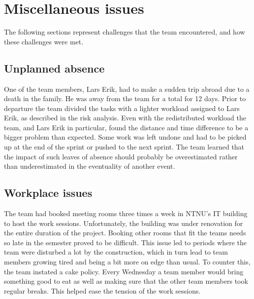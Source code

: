 \section{Miscellaneous issues}
The following sections represent challenges that the team encountered, and how these challenges were met.

\subsection{Unplanned absence}
One of the team members, Lars Erik, had to make a sudden trip abroad due to a
death in the family. He was away from the team for a total for 12 days. Prior
to departure the team divided the tasks with a lighter workload assigned to Lars
Erik, as described in the risk analysis. Even with the redistributed workload
the team, and Lars Erik in particular, found the distance and time difference to
be a bigger problem than expected. Some work was left undone and had to be
picked up at the end of the sprint or pushed to the next sprint. The team
learned that the impact of such leaves of absence should probably be
overestimated rather than underestimated in the eventuality of another event.

\subsection{Workplace issues}
The team had booked meeting rooms three times a week in NTNU's IT building to host the work sessions. Unfortunately, the building was under renovation for the entire duration of the project. Booking other rooms that fit the teams needs so late in the semester proved to be difficult. This issue led to periods where the team were disturbed a lot by the construction, which in turn lead to team members growing tired and being a bit more on edge than usual. To counter this, the team instated a cake policy. Every Wednesday a team member would bring something good to eat as well as making sure that the other team members took regular breaks. This helped ease the tension of the work sessions.

\begin{comment}
\subsection{Excessive discussion}
The team has seen that much time is being spent discussing a lot. The discussion was of importance, but it drained too much of the time. To solve this, it was decided that there should be set a certain amount of time for the discussions. Should the discussions last longer than the time set, the project leader's task was to focus on ending the discussions, and instead perform a democratic vote based on the arguments that were presented. 
\end{comment}

